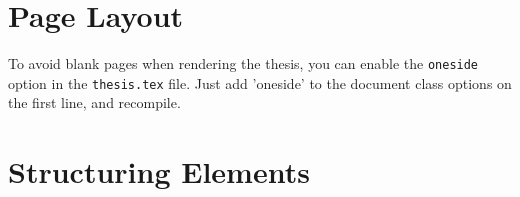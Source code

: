 
\section{Page Layout}


To avoid blank pages when rendering the thesis, you can enable the \texttt{oneside} option in the \texttt{thesis.tex} file. Just add 'oneside' to the document class options on the first line, and recompile.

\section{Structuring Elements}








